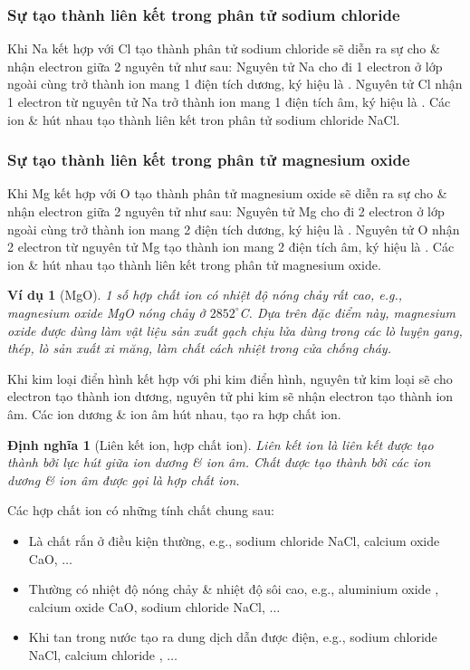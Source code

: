 \documentclass{article}
\newtheorem{dinhnghia}{Định nghĩa}
\newtheorem{vidu}{Ví dụ}
\begin{document}
\subsubsection{Sự tạo thành liên kết trong phân tử sodium chloride}
Khi Na kết hợp với Cl tạo thành phân tử sodium chloride sẽ diễn ra sự cho \& nhận electron giữa 2 nguyên tử như sau: Nguyên tử Na cho đi 1 electron ở lớp ngoài cùng trở thành ion mang 1 điện tích dương, ký hiệu là . Nguyên tử Cl nhận 1 electron từ nguyên tử Na trở thành ion mang 1 điện tích âm, ký hiệu là . Các ion  \&  hút nhau tạo thành liên kết tron phân tử sodium chloride NaCl.

\subsubsection{Sự tạo thành liên kết trong phân tử magnesium oxide}
Khi Mg kết hợp với O tạo thành phân tử magnesium oxide sẽ diễn ra sự cho \& nhận electron giữa 2 nguyên tử như sau: Nguyên tử Mg cho đi 2 electron ở lớp ngoài cùng trở thành ion mang 2 điện tích dương, ký hiệu là . Nguyên tử O nhận 2 electron từ nguyên tử Mg tạo thành ion mang 2 điện tích âm, ký hiệu là . Các ion  \&  hút nhau tạo thành liên kết trong phân tử magnesium oxide.

\begin{vidu}[MgO]
	1 số hợp chất ion có nhiệt độ nóng chảy rất cao, e.g., magnesium oxide \emph{MgO} nóng chảy ở $2852^\circ$C. Dựa trên đặc điểm này, magnesium oxide được dùng làm vật liệu sản xuất gạch chịu lửa dùng trong các lò luyện gang, thép, lò sản xuất xi măng, làm chất cách nhiệt trong cửa chống cháy.
\end{vidu}
Khi kim loại điển hình kết hợp với phi kim điển hình, nguyên tử kim loại sẽ cho electron tạo thành ion dương, nguyên tử phi kim sẽ nhận electron tạo thành ion âm. Các ion dương \& ion âm hút nhau, tạo ra hợp chất ion.

\begin{dinhnghia}[Liên kết ion, hợp chất ion]
	\emph{Liên kết ion} là liên kết được tạo thành bởi lực hút giữa ion dương \& ion âm. Chất được tạo thành bởi các ion dương \& ion âm được gọi là \emph{hợp chất ion}.
\end{dinhnghia}
Các hợp chất ion có những tính chất chung sau:
\begin{itemize}
	\item Là chất rắn ở điều kiện thường, e.g., sodium chloride NaCl, calcium oxide CaO, $\ldots$
	\item Thường có nhiệt độ nóng chảy \& nhiệt độ sôi cao, e.g., aluminium oxide , calcium oxide CaO, sodium chloride NaCl, $\ldots$
	\item Khi tan trong nước tạo ra dung dịch dẫn được điện, e.g., sodium chloride NaCl, calcium chloride , $\ldots$
\end{itemize}
\end{document}
